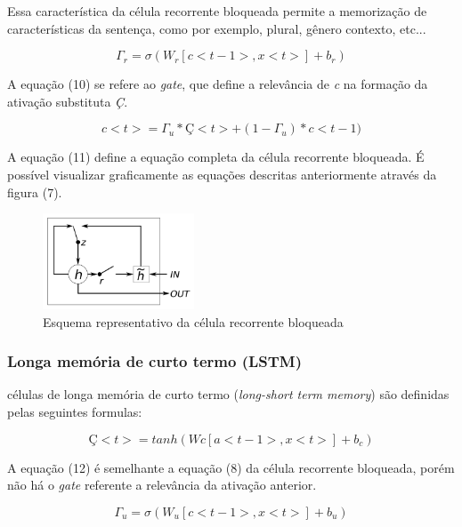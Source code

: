 \documentclass[12pt]{article}
\begin{document}
Essa característica da célula recorrente bloqueada permite a memorização de características da sentença, como por exemplo, plural, gênero contexto, etc...

\begin{equation}
    \Gamma_r = \sigma(W_r[c<t-1>, x<t>]+b_r)
\end{equation}

A equação (10) se refere ao \textit{gate}, que define a relevância de \textit{c} na formação da ativação substituta \textit{Ç}.

\begin{equation}
    c<t>=\Gamma_u*Ç<t>+(1-\Gamma_u)*c<t-1)
\end{equation}

A equação (11) define a equação completa da célula recorrente bloqueada. É possível visualizar graficamente as equações descritas anteriormente através da figura (7).

\begin{figure}[!htb]
\centering
\includegraphics[width=0.4\textwidth]{images/gru_gate.png}
\caption{Esquema representativo da célula recorrente bloqueada \cite{DBLP:journals/corr/ChungGCB14}}
\label{fig:gru_gaet}
\end{figure}

\subsubsection{Longa memória de curto termo (LSTM)}

células de longa memória de curto termo (\textit{long-short term memory}) são definidas pelas seguintes formulas:

\begin{equation}
    Ç<t> = tanh(Wc[a<t-1>, x<t>]+b_c)
\end{equation}

A equação (12) é semelhante a equação (8) da célula recorrente bloqueada, porém não há o \textit{gate} referente a relevância da ativação anterior.

\begin{equation}
    \Gamma_u = \sigma(W_u[c<t-1>, x<t>]+b_u)
\end{equation}
\end{document}
